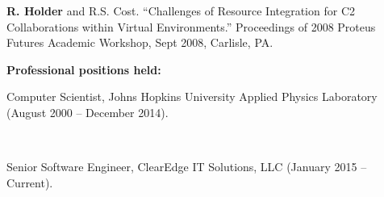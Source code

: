 \begin{titlepage}
\begin{flushleft}
\begin{singlespace}
{\hspace{0.4in}} \parbox[t]{5.5in}{\textbf{R. Holder} and R.S. Cost.  ``Challenges of Resource Integration for C2 Collaborations within Virtual Environments.''  Proceedings of 2008 Proteus Futures Academic Workshop, Sept 2008, Carlisle, PA.}
\end{singlespace} 

\vspace{8pt}
	{\bf Professional positions held:}\\
	\begin{singlespace}
	{\hspace{0.4in}}\parbox[t]{5.5in}{Computer Scientist, Johns Hopkins University Applied Physics Laboratory (August 2000 -- December 2014).}\\
	{\hspace{0.4in}}\parbox[t]{5.5in}{Senior Software Engineer, ClearEdge IT Solutions, LLC (January 2015 -- Current).}\\	\end{singlespace}
\end{flushleft}
       
\end{titlepage}
\par\vfil


